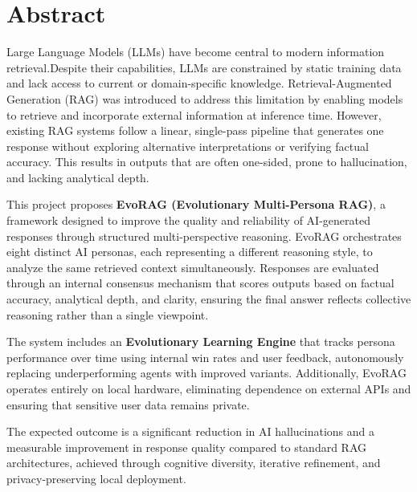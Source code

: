 \chapter*{Abstract}
\thispagestyle{plain}

Large Language Models (LLMs) have become central to modern information retrieval.Despite their capabilities, LLMs are constrained by static training data and lack access to current or domain-specific knowledge. Retrieval-Augmented Generation (RAG) was introduced to address this limitation by enabling models to retrieve and incorporate external information at inference time. However, existing RAG systems follow a linear, single-pass pipeline that generates one response without exploring alternative interpretations or verifying factual accuracy. This results in outputs that are often one-sided, prone to hallucination, and lacking analytical depth.

This project proposes \textbf{EvoRAG (Evolutionary Multi-Persona RAG)}, a framework designed to improve the quality and reliability of AI-generated responses through structured multi-perspective reasoning. EvoRAG orchestrates eight distinct AI personas, each representing a different reasoning style, to analyze the same retrieved context simultaneously. Responses are evaluated through an internal consensus mechanism that scores outputs based on factual accuracy, analytical depth, and clarity, ensuring the final answer reflects collective reasoning rather than a single viewpoint.

The system includes an \textbf{Evolutionary Learning Engine} that tracks persona performance over time using internal win rates and user feedback, autonomously replacing underperforming agents with improved variants. Additionally, EvoRAG operates entirely on local hardware, eliminating dependence on external APIs and ensuring that sensitive user data remains private.

The expected outcome is a significant reduction in AI hallucinations and a measurable improvement in response quality compared to standard RAG architectures, achieved through cognitive diversity, iterative refinement, and privacy-preserving local deployment.